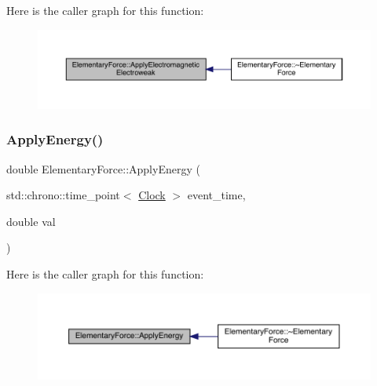 Here is the caller graph for this function\+:
\nopagebreak
\begin{figure}[H]
\begin{center}
\leavevmode
\includegraphics[width=350pt]{class_elementary_force_a3764a27b11760b6ead2c8a23ff25d77a_icgraph}
\end{center}
\end{figure}
\mbox{\label{class_elementary_force_a0961328b260cb4dfb2ba54f4e284f0e8}} 
\subsubsection{\texorpdfstring{Apply\+Energy()}{ApplyEnergy()}}
{\footnotesize\ttfamily double Elementary\+Force\+::\+Apply\+Energy (\begin{DoxyParamCaption}\item[{std\+::chrono\+::time\+\_\+point$<$ \hyperlink{universe_8h_a0ef8d951d1ca5ab3cfaf7ab4c7a6fd80}{Clock} $>$}]{event\+\_\+time,  }\item[{double}]{val }\end{DoxyParamCaption})}

Here is the caller graph for this function\+:
\nopagebreak
\begin{figure}[H]
\begin{center}
\leavevmode
\includegraphics[width=350pt]{class_elementary_force_a0961328b260cb4dfb2ba54f4e284f0e8_icgraph}
\end{center}
\end{figure}
\mbox{\label{class_elementary_force_a655a2c9489bfbbf15e05ba4953628134}} 
